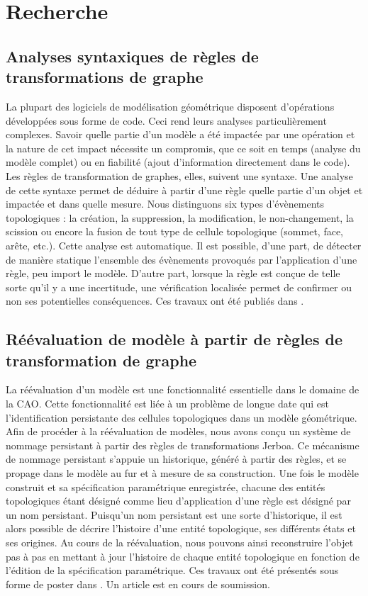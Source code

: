 \documentclass[11pt,a4paper,oneside]{article}
\begin{document}
\section{Recherche}

\subsection{Analyses syntaxiques de règles de transformations de graphe}
La plupart des logiciels de modélisation géométrique disposent d'opérations
développées sous forme de code. %
Ceci rend leurs analyses particulièrement complexes. %
Savoir quelle partie d'un modèle a été impactée par une opération et la nature
de cet impact nécessite un compromis, que ce soit en temps (analyse du modèle
complet) ou en fiabilité (ajout d'information directement dans le code). %
Les règles de transformation de graphes, elles, suivent une syntaxe. %
Une analyse de cette syntaxe permet de déduire à partir d'une règle quelle
partie d'un objet et impactée et dans quelle mesure. %
Nous distinguons six types d'évènements topologiques : la création, la
suppression, la modification, le non-changement, la scission ou encore la fusion
de tout type de cellule topologique (sommet, face, arête, etc.). %
Cette analyse est automatique. %
Il est possible, d'une part, de détecter de manière statique l'ensemble des
évènements provoqués par l'application d'une règle, peu import le modèle. %
D'autre part, lorsque la règle est conçue de telle sorte qu'il y a une
incertitude, une vérification localisée permet de confirmer ou non ses
potentielles conséquences. %
Ces travaux ont été publiés dans \cite{gaide2023automatic}. %

\subsection{Réévaluation de modèle à partir de règles de transformation de graphe}
La réévaluation d'un modèle est une fonctionnalité essentielle dans le domaine
de la CAO. %
Cette fonctionnalité est liée à un problème de longue date qui est
l'identification persistante des cellules topologiques dans un modèle
géométrique. %
Afin de procéder à la réévaluation de modèles, nous avons conçu un système de
nommage persistant à partir des règles de transformations Jerboa. %
Ce mécanisme de nommage persistant s'appuie un historique, généré à partir des
règles, et se propage dans le modèle au fur et à mesure de sa construction. %
Une fois le modèle construit et sa spécification paramétrique enregistrée,
chacune des entités topologiques étant désigné comme lieu d'application d'une
règle est désigné par un nom persistant. %
Puisqu'un nom persistant est une sorte d'historique, il est alors possible de
décrire l'histoire d'une entité topologique, ses différents états et ses
origines. %
Au cours de la réévaluation, nous pouvons ainsi reconstruire l'objet pas à pas
en mettant à jour l'histoire de chaque entité topologique en fonction de
l'édition de la spécification paramétrique. %
Ces travaux ont été présentés sous forme de poster dans \cite{gaide2023model}. %
Un article est en cours de soumission. %
\end{document}
